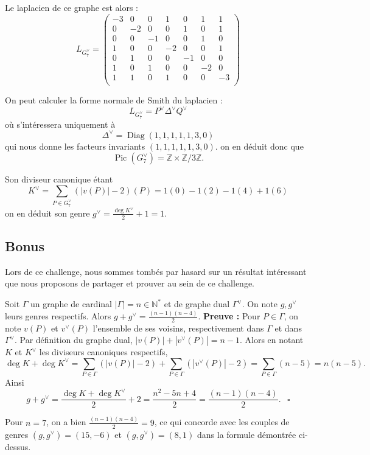\documentclass{article}
\newcommand{\bZ}{\mathbb{Z}}
\newcommand{\bN}{\mathbb{N}}
\newcommand{\Pic}{\operatorname{Pic}}
\newcommand{\deg}{\operatorname{deg}}
\newcommand{\Diag}{\operatorname{Diag}}
\begin{document}
Le laplacien de ce graphe est alors :
\[L_{G_7^\vee} = \begin{pmatrix}
-3&0&0&1&0&1&1\\
0&-2&0&0&1&0&1\\
0&0&-1&0&0&1&0\\
1&0&0&-2&0&0&1\\
0&1&0&0&-1&0&0\\
1&0&1&0&0&-2&0\\
1&1&0&1&0&0&-3\\
\end{pmatrix}\]

On peut calculer la forme normale de Smith du laplacien :
\[L_{G_7^\vee} = P^\vee\Delta^\vee Q^\vee\]
où s'intéressera uniquement à
\[\Delta^\vee = \Diag(1,1,1,1,1,3,0)\]
qui nous donne les facteurs invariants $(1,1,1,1,1,3,0)$. on en déduit donc que
\[\Pic(G_7^\vee) = \bZ\times \bZ/3\bZ.\]

Son diviseur canonique étant \[K^\vee = \sum_{P\in G_7^\vee}(|v(P)|-2)(P) = 1(0) -1(2) -1(4) + 1(6)\]
on en déduit son genre $\displaystyle g^\vee = \frac{\deg K^\vee}{2}+1 = 1$.
\newpage
\subsection{Bonus}
Lors de ce challenge, nous sommes tombés par hasard sur un résultat intéressant que nous proposons de partager et prouver au sein de ce challenge.

\begin{tcolorbox}[colback=red!5!white,colframe=red!75!black,title=Propriété : Genre du dual]
    Soit $\Gamma$ un graphe de cardinal $|\Gamma| = n\in \bN^*$ et de graphe dual $\Gamma^\vee$. On note $g,g^\vee$ leurs genres respectifs. Alors $\displaystyle g + g^\vee = \frac{(n-1)(n-4)}{2}.$
    \tcblower
    \textbf{Preuve :} Pour $P\in \Gamma$, on note $v(P)$ et $v^\vee(P)$ l'ensemble de ses voisins, respectivement dans $\Gamma$ et dans $\Gamma^\vee$. Par définition du graphe dual, $|v(P)| + |v^\vee(P)| = n-1$. Alors en notant $K$ et $K^\vee$ les diviseurs canoniques respectifs, \[\deg K+\deg K^\vee = \sum_{P\in \Gamma}(|v(P)|-2) + \sum_{P\in \Gamma}(|v^\vee(P)|-2) = \sum_{P\in \Gamma}(n-5) = n(n-5).\]
    Ainsi
    \[g+g^\vee = \frac{\deg K+\deg K^\vee}{2}+2 = \frac{n^2-5n+4}{2} = \frac{(n-1)(n-4)}{2}. \hspace{9pt} \square\]
\end{tcolorbox}

Pour $n=7$, on a bien $\displaystyle \frac{(n-1)(n-4)}{2} = 9$, ce qui concorde avec les couples de genres $(g,g^\vee) = (15,-6)$ et $(g,g^\vee) =(8,1)$ dans la formule démontrée ci-dessus.
\end{document}
